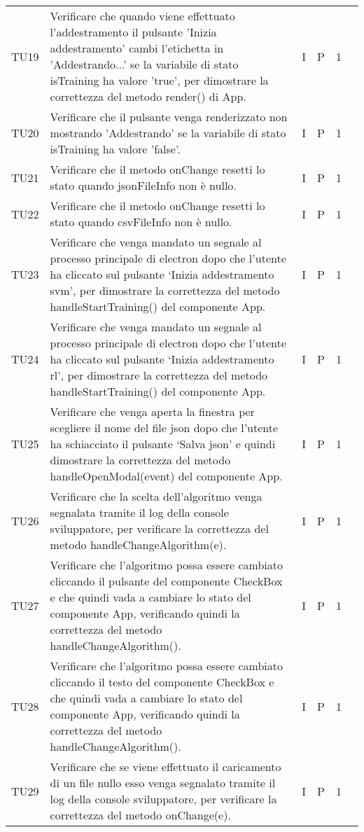 \begin{longtable} {
		>{}p{12mm}
		>{}p{79.5mm}
		>{}p{9mm}
		>{}p{8mm}
		>{}p{14mm}
		>{}p{0mm}}
	TU19		& Verificare che quando viene effettuato l'addestramento il pulsante 'Inizia addestramento' cambi l'etichetta in 'Addestrando...' se la variabile di stato isTraining ha valore 'true', per dimostrare la correttezza del metodo render() di App.& I & P & 1 &\TBstrut \\ [2mm]
	TU20		& Verificare che il pulsante venga renderizzato non mostrando 'Addestrando' se la variabile di stato isTraining ha valore 'false'.& I & P & 1 &\TBstrut \\ [2mm]
	TU21		& Verificare che il metodo onChange resetti lo stato quando jsonFileInfo non è nullo.& I & P & 1 &\TBstrut \\ [2mm]
	TU22		& Verificare che il metodo onChange resetti lo stato quando csvFileInfo non è nullo.& I & P & 1 &\TBstrut \\ [2mm]
	TU23		& Verificare che venga mandato un segnale al processo principale di electron dopo che l’utente ha cliccato sul pulsante ‘Inizia addestramento svm’, per dimostrare la correttezza del metodo handleStartTraining() del componente App.& I & P & 1 &\TBstrut \\ [2mm]
	TU24		& Verificare che venga mandato un segnale al processo principale di electron dopo che l’utente ha cliccato sul pulsante ‘Inizia addestramento rl’, per dimostrare la correttezza del metodo handleStartTraining() del componente App.& I & P & 1 &\TBstrut \\ [2mm]
	TU25		& Verificare che venga aperta la finestra per scegliere il nome del file json dopo che l’utente ha schiacciato il pulsante ‘Salva json’ e quindi dimostrare la correttezza del metodo handleOpenModal(event) del componente App.& I & P & 1 &\TBstrut \\ [2mm]
	TU26		& Verificare che la scelta dell'algoritmo venga segnalata tramite il log della console sviluppatore, per verificare la correttezza del metodo handleChangeAlgorithm(e).& I & P & 1 &\TBstrut \\ [2mm]
	TU27		& Verificare che l'algoritmo possa essere cambiato cliccando il pulsante del componente CheckBox e che quindi vada a cambiare lo stato del componente App, verificando quindi la correttezza del metodo handleChangeAlgorithm().& I & P & 1 &\TBstrut \\ [2mm]
	TU28		& Verificare che l'algoritmo possa essere cambiato cliccando il testo del componente CheckBox e che quindi vada a cambiare lo stato del componente App, verificando quindi la correttezza del metodo handleChangeAlgorithm().& I & P & 1 &\TBstrut \\ [2mm]
	TU29		& Verificare che se viene effettuato il caricamento di un file nullo esso venga segnalato tramite il log della console sviluppatore, per verificare la correttezza del metodo onChange(e).& I & P & 1 &\TBstrut \\ [2mm]


\end{longtable}
